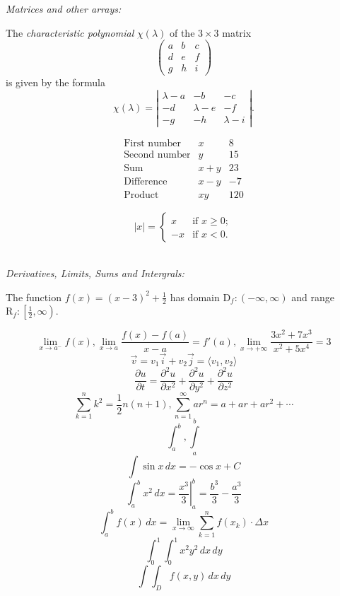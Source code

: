 \documentclass[12pt]{article}
\begin{document}
\noindent
\begin{large}\textit{Matrices and other arrays:}\end{large}

The \emph{characteristic polynomial} $\chi(\lambda)$ of the $3 \times 3$ matrix
\[ \left( \begin{array}{ccc}
a & b & c \\
d & e & f \\
g & h & i \end{array} \right)\]
is given by the formula
\[ \chi(\lambda) = \left| \begin{array}{ccc}
\lambda - a & -b & -c \\
-d & \lambda - e & -f \\
-g & -h & \lambda - i \end{array} \right|.\]

\[ \begin{array}{lcr}
\mbox{First number} & x & 8 \\
\mbox{Second number} & y & 15 \\
\mbox{Sum} & x + y & 23 \\
\mbox{Difference} & x - y & -7 \\
\mbox{Product} & xy & 120 \end{array}\]

\[ |x| = \left\{ \begin{array}{ll}
		x & \mbox{if $x \geq 0$}; \\
	   -x & \mbox{if $x < 0$}.\end{array} \right. \] \\
	   
\noindent	   
\begin{large}\textit{Derivatives, Limits, Sums and Intergrals:}\end{large}

The function $f(x)=(x-3)^2+\frac{1}{2}$ has domain $\mathrm{D}_f:(-\infty,\infty)$ and range $\mathrm{R}_f:\left[\frac{1}{2},\infty\right)$.

\[ \lim \limits_{x \to a^-} f(x),
   \lim_{x \to a} \frac{f(x)-f(a)}{x-a} = f'(a),
   \lim_{x \to +\infty} \frac{3x^2 + 7x^3}{x^2 + 5x^4} = 3 \]
\[ \vec{v} = v_1 \vec{i} + v_2\vec{j}
   = \langle v_1, v_2 \rangle \]
\[ \frac{\partial u}{\partial t}
	= \frac{\partial^2 u}{\partial x^2}
	+ \frac{\partial^2 u}{\partial y^2}
	+ \frac{\partial^2 u}{\partial z^2} \]
\[ \sum_{k = 1}^n k^2 = \frac{1}{2} n (n+1),
   \sum \limits_{n = 1}^{\infty} ar^n = a + ar + ar^2 + \cdots \]
\[ \int_a^b, \int \limits_a^b \]
\[ \int \sin x \, dx = -\cos x + C \]
\[ \int_a^b x^2 \,dx
   = \left. \frac{x^3}{3} \right|_a^b
   = \frac{b^3}{3} - \frac{a^3}{3} \]
\[ \int_a^b f(x) \,dx
   = \lim_{x \to \infty} \sum_{k=1}^{n}f(x_k) \cdot \Delta x \]
\[ \int_0^1 \! \int_0^1 x^2 y^2\,dx\,dy\]
\[ \int \!\!\! \int_D f(x,y)\,dx\,dy \] \\
\end{document}
